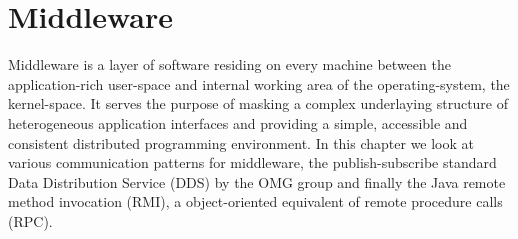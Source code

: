 \chapter{Middleware} \label{ch:middleware}

Middleware is a layer of software residing on every machine between the application-rich user-space and internal working area of the operating-system, the kernel-space. It serves the purpose of masking a complex underlaying structure of heterogeneous application interfaces and providing a simple, accessible and consistent distributed programming environment. In this chapter we look at various communication patterns for middleware, the publish-subscribe standard Data Distribution Service (DDS) by the OMG group and finally the Java remote method invocation (RMI), a object-oriented equivalent of remote procedure calls (RPC).





